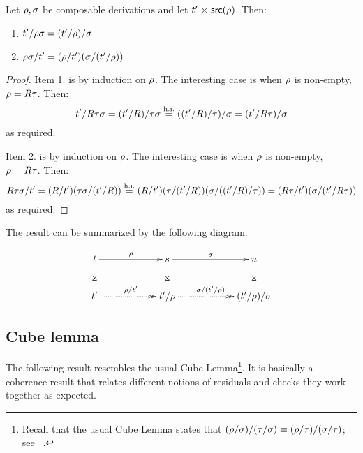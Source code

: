 \begin{lemma}
Let $\rho,\sigma$ be composable derivations and let $t' \mathrel{\ltimes} \mathsf{src}(\rho)$.
Then:
\begin{enumerate}
\item $t'/\rho\sigma = (t'/\rho)/\sigma$
\item $\rho\sigma/t' = (\rho/t')(\sigma/(t'/\rho))$
\end{enumerate}
\end{lemma}
\begin{proof}
Item 1. is by induction on $\rho$.
The interesting case is when $\rho$ is non-empty, \ie $\rho = R\tau$.
Then:
  \[
          t'/R\tau\sigma
    =     (t'/R)/\tau\sigma
    \overset{\mathrm{h.i.}}{=} ((t'/R)/\tau)/\sigma
    =     (t'/R\tau)/\sigma
  \]
as required.

Item 2. is by induction on $\rho$.
The interesting case is when $\rho$ is non-empty, \ie $\rho = R\tau$.
Then:
  \[
          R\tau\sigma/t'
    =     (R/t')(\tau\sigma/(t'/R))
    \overset{\mathrm{h.i.}}{=} (R/t')(\tau/(t'/R))(\sigma/((t'/R)/\tau))
    =     (R\tau/t')(\sigma/(t'/R\tau))
  \]
as required.
\end{proof}

The result can be summarized by the following diagram.

\[
\xymatrix@C=2cm{
 \tm \ar@{}[d]|*=0[@]{\rtimes} \ar[r]^{\redseq}
  & \tmtwo \ar@{}[d]|*=0[@]{\rtimes} \ar[r]^{\redseqtwo}
  & \tmthree \ar@{}[d]|*=0[@]{\rtimes} \\
 \tm' \ar@{.>>}[r]^{\redseq/\tm'}
  & \tm'/\redseq \ar@{.>>}[r]^{\sigma/(\tm'/\redseq)}
  & (\tm'/\redseq) / \redseqtwo
 \\
}
\]

\subsection*{Cube lemma}

The following result resembles the usual Cube Lemma\footnote{
  Recall that the usual Cube Lemma states
  that $(\rho/\sigma)/(\tau/\sigma) \equiv (\rho/\tau)/(\sigma/\tau)$;
  see \eg~\cite[Lemma~12.2.6]{Barendregt:1984}.
}.
It is basically a coherence result that relates different notions of residuals
and checks they work together as expected.

